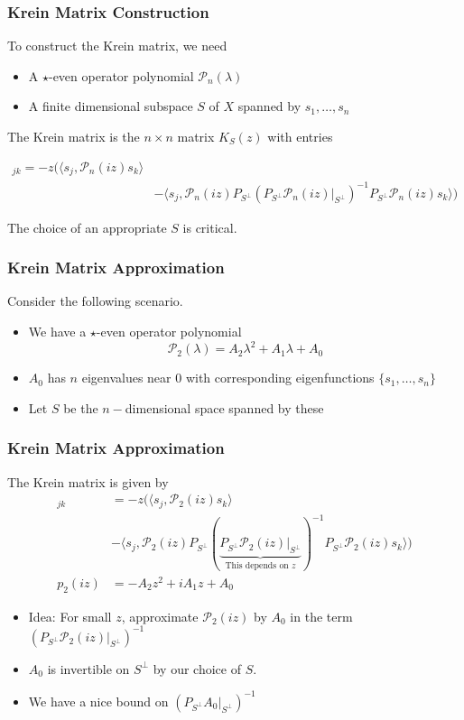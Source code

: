 \documentclass[16pt]{beamer}
\newcommand{\calP}{\mathcal{P}}
\begin{document}
\begin{frame}
\frametitle{Krein Matrix Construction}
	To construct the Krein matrix, we need
	\begin{itemize}
		\item A $\star$-even operator polynomial $\calP_n(\lambda)$
		\item A finite dimensional subspace $S$ of $X$ spanned by $s_1, \dots, s_n$
	\end{itemize}

	The Krein matrix is the $n \times n$ matrix $K_S(z)$ with entries

        \begin{align*}
        [K_S&(z)]_{jk} = -z \Big( 
        \langle s_j , \calP_n(iz)s_k\rangle \\
        &- \langle s_j , \calP_n(iz) P_{S^{\perp}} (P_{S^{\perp}} \calP_n(iz)|_{S^{\perp}} )^{-1} P_{S^{\perp}} \calP_n(iz) s_k \rangle \Big)
        \end{align*}

    The choice of an appropriate $S$ is critical.
\end{frame}

\begin{frame}
\frametitle{Krein Matrix Approximation}
	Consider the following scenario. 
	\begin{itemize}	
	\item We have a $\star$-even operator polynomial
	\[ \calP_2(\lambda) = A_2 \lambda^2 + A_1 \lambda + A_0 \]
	\item $A_0$ has $n$ eigenvalues near 0 with corresponding eigenfunctions $\{s_1, \dots, s_n \}$
	\item Let $S$ be the $n-$dimensional space spanned by these
	\end{itemize}
\end{frame}

\begin{frame}
\frametitle{Krein Matrix Approximation}
	The Krein matrix is given by
	\begin{align*}
        [K(z)]_{jk} &= -z \Big( 
        \langle s_j , \calP_2(iz)s_k\rangle \\
        &- \langle s_j , \calP_2(iz) P_{S^{\perp}} (\underbrace{P_{S^{\perp}} \calP_2(iz)|_{S^{\perp}} }_{\text{This depends on }z})^{-1} P_{S^{\perp}} \calP_2(iz) s_k \rangle \Big) \\
        p_2(iz) &= -A_2 z^2 + i A_1 z + A_0
    \end{align*}

    \begin{itemize}
    \item<1-> Idea: For small $z$, approximate $\calP_2(iz)$ by $A_0$ in the term $(P_{S^{\perp}} \calP_2(iz)|_{S^{\perp}})^{-1}$
    \item<2-> $A_0$ is invertible on $S^\perp$ by our choice of $S$.
    \item<2-> We have a nice bound on $(P_{S^{\perp}} A_0|_{S^{\perp}})^{-1}$
	\end{itemize}
\end{frame}
\end{document}
